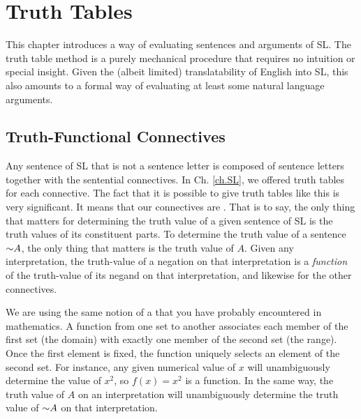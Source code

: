 \chapter{Truth Tables}
\label{ch.TruthTables}

This chapter introduces a way of evaluating sentences and arguments of SL.
The truth table method is a purely mechanical procedure that requires no intuition or special insight.
Given the (albeit limited) translatability of English into SL, this also amounts to a formal way of evaluating at least some natural language arguments.




\section{Truth-Functional Connectives}

Any sentence of SL that is not a sentence letter is composed of sentence letters together with the sentential connectives.
In Ch. \ref{ch.SL}, we offered truth tables for each connective.
The fact that it is possible to give truth tables like this is very significant.
It means that our connectives are .
That is to say, the only thing that matters for determining the truth value of a given sentence of SL is the truth values of its constituent parts.
To determine the truth value of a sentence $\enot A$, the only thing that matters is the truth value of $A$.
Given any interpretation, the truth-value of a negation on that interpretation is a \emph{function} of the truth-value of its negand on that interpretation, and likewise for the other connectives.

We are using the same notion of a  that you have probably encountered in mathematics.
A function from one set to another associates each member of the first set (the domain) with exactly one member of the second set (the range).
Once the first element is fixed, the function uniquely selects an element of the second set.
For instance, any given numerical value of $x$ will unambiguously determine the value of $x^{2}$, so $f(x)=x^{2}$ is a function.
In the same way, the truth value of $A$ on an interpretation will unambiguously determine the truth value of $\enot A$ on that interpretation.

